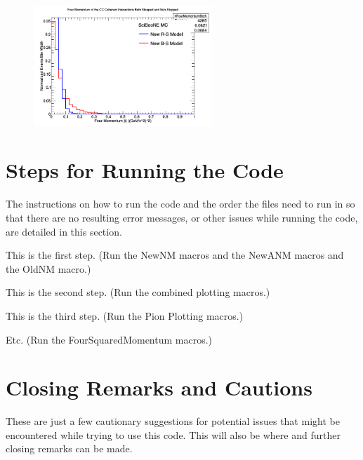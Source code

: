 \documentclass[11pt]{article}
\begin{document}
\begin{figure}[H]
\centering
\includegraphics[width=0.6\textwidth]{ANMFourSquaredPlottingImages/6-ANMFourSquaredPlotting.png}
\caption{}
\end{figure}



\section{Steps for Running the Code}
The instructions on how to run the code and the order the files need to run in so that there are no resulting error messages, or other issues while running the code, are detailed in this section.

\begin{adjustwidth}{4.0em}{0pt}
\begin{steps}
  \item This is the first step. (Run the NewNM macros and the NewANM macros and the OldNM macro.)
  \item This is the second step. (Run the combined plotting macros.)
  \item This is the third step. (Run the Pion Plotting macros.)
  \item Etc. (Run the FourSquaredMomentum macros.)
\end{steps}
\end{adjustwidth}



\section{Closing Remarks and Cautions}
These are just a few cautionary suggestions for potential issues that might be encountered while trying to use this code. This will also be where and further closing remarks can be made.
\end{document}
